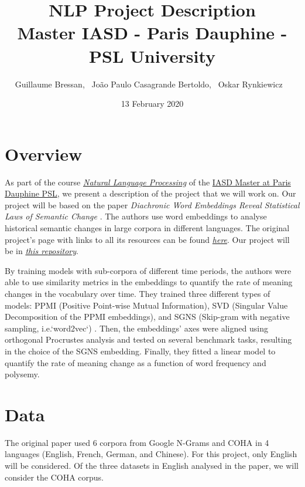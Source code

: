 \documentclass[11pt, twocolumn]{extarticle}
\title{
    \Huge NLP Project Description \\ \medskip 
    \large Master IASD - Paris Dauphine - PSL University
}
\author{
    Guillaume Bressan, \
    João Paulo Casagrande Bertoldo, \
    Oskar Rynkiewicz \ 
}
\date{13 February 2020}
\begin{document}
\maketitle

\section{Overview}

As part of the course \href{https://allauzen.github.io/cours/NLP_IASD/}{\textit{Natural Language Processing}} of the \href{https://www.lamsade.dauphine.fr/wp/iasd/en/}{IASD Master at Paris Dauphine PSL}, we present a description of the project that we will work on. Our project will be based on the paper \textit{Diachronic Word Embeddings Reveal Statistical Laws of Semantic Change} \cite{hamilton-etal-2016-diachronic}. The authors use word embeddings to analyse historical semantic changes in large corpora in different languages. The original project's page with links to all its resources can be found \href{https://nlp.stanford.edu/projects/histwords/data_description.html}{\textit{here}}. Our project will be in \href{https://github.com/joaopcbertoldo/jokar}{\textit{this repository}}.
\par

By training models with sub-corpora of different time periods, the authors were able to use similarity metrics in the embeddings to quantify the rate of meaning changes in the vocabulary over time. They trained three different types of models: PPMI (Positive Point-wise Mutual Information), SVD (Singular Value Decomposition of the PPMI embeddings), and SGNS (Skip-gram with negative sampling, i.e.\@ `word2vec`) \cite{mikolov2013distributed}. Then, the embeddings' axes were aligned using orthogonal Procrustes analysis and tested on several benchmark tasks, resulting in the choice of the SGNS embedding. Finally, they fitted a linear model to quantify the rate of meaning change as a function of word frequency and polysemy.

\section{Data}

The original paper used 6 corpora from Google N-Grams \cite{google-n-grams} and COHA \cite{coha} in 4 languages (English, French, German, and Chinese). For this project, only English will be considered. Of the three datasets in English analysed in the paper, we will consider the COHA corpus. 
\par 
\end{document}
